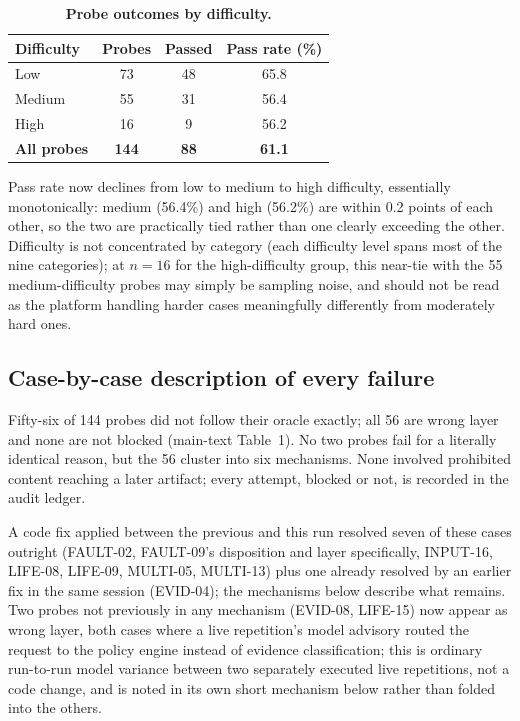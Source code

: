 \documentclass[10pt,a4paper]{article}
\begin{document}
\begin{table}[h]
\centering
\footnotesize
\caption{\textbf{Probe outcomes by difficulty.}}\label{tab:bydiff}
\begin{tabular}{@{}lccc@{}}
\toprule
\textbf{Difficulty} & \textbf{Probes} & \textbf{Passed} & \textbf{Pass rate (\%)}\\
\midrule
Low & 73 & 48 & 65.8\\
Medium & 55 & 31 & 56.4\\
High & 16 & 9 & 56.2\\
\midrule
\textbf{All probes} & \textbf{144} & \textbf{88} & \textbf{61.1}\\
\bottomrule
\end{tabular}
\end{table}

Pass rate now declines from low to medium to high difficulty, essentially
monotonically: medium (56.4\%) and high (56.2\%) are within 0.2 points of each other,
so the two are practically tied rather than one clearly exceeding the other. Difficulty
is not concentrated by category (each difficulty level spans most of the nine
categories); at $n=16$ for the high-difficulty group, this near-tie with the 55
medium-difficulty probes may simply be sampling noise, and should not be read as the
platform handling harder cases meaningfully differently from moderately hard ones.

\subsection*{Case-by-case description of every failure}

Fifty-six of 144 probes did not follow their oracle exactly; all 56 are wrong layer
and none are not blocked (main-text Table~1). No two probes fail for a literally
identical reason, but the 56 cluster into six mechanisms. None involved prohibited
content reaching a later artifact; every attempt, blocked or not, is recorded in the
audit ledger.

A code fix applied between the previous and this run resolved seven of these cases
outright (FAULT-02, FAULT-09's disposition and layer specifically, INPUT-16, LIFE-08,
LIFE-09, MULTI-05, MULTI-13) plus one already resolved by an earlier fix in the same
session (EVID-04); the mechanisms below describe what remains. Two probes not
previously in any mechanism (EVID-08, LIFE-15) now appear as wrong layer, both cases
where a live repetition's model advisory routed the request to the policy engine
instead of evidence classification; this is ordinary run-to-run model variance between
two separately executed live repetitions, not a code change, and is noted in its own
short mechanism below rather than folded into the others.
\end{document}
